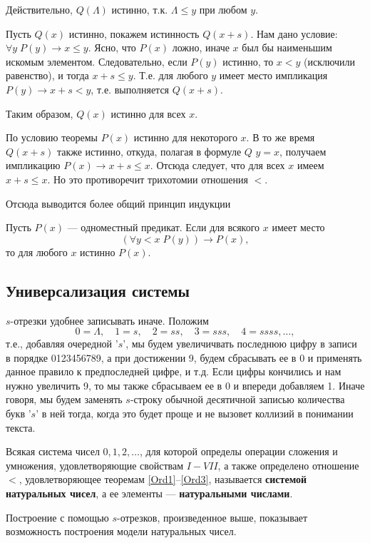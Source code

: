 Действительно, $Q(\Lambda)$ истинно, т.к. $\Lambda\le y$ при любом $y$.

Пусть $Q(x)$ истинно, покажем истинность $Q(x+s)$. Нам дано условие: $\forall y\;P(y)\to x\le y$. Ясно, что $P(x)$ ложно, иначе $x$ был бы наименьшим искомым элементом. Следовательно, если $P(y)$ истинно, то $x<y$ (исключили равенство), и тогда $x+s\le y$. Т.е. для любого $y$ имеет место импликация $P(y)\to x+s<y$, т.е. выполняется $Q(x+s)$.

Таким образом, $Q(x)$ истинно для всех $x$.

По условию теоремы $P(x)$ истинно для некоторого $x$. В то же время $Q(x+s)$ также истинно, откуда, полагая в формуле $Q$ $y=x$, получаем импликацию $P(x)\to x+s\le x$. Отсюда следует, что для всех $x$ имеем $x+s\le x$. Но это противоречит трихотомии отношения $<$.
\epf

Отсюда выводится более общий принцип индукции
\begin{thrm} Пусть $P(x)$ --- одноместный предикат. Если для всякого $x$ имеет место
$$
(\forall y<x\;P(y))\to P(x),
$$
то для любого $x$ истинно $P(x)$.
\end{thrm}



\subsection{Универсализация системы}


$s$-отрезки удобнее записывать иначе. Положим
$$
0=\Lambda,\quad 1=s,\quad 2=ss,\quad 3=sss,\quad 4=ssss,\dots,
$$
т.е., добавляя очередной '$s$', мы будем увеличичвать последнюю цифру в записи в порядке 0123456789, а при достижении 9, будем сбрасывать ее в 0 и применять данное правило к предпоследней цифре, и т.д. Если цифры кончились и нам нужно увеличить 9, то мы также сбрасываем ее в 0 и впереди добавляем 1. Иначе говоря, мы будем заменять $s$-строку обычной десятичной записью количества букв '$s$' в ней тогда, когда это будет проще и не вызовет коллизий в понимании текста.

Всякая система чисел $0,1,2,\dots$, для которой определы операции сложения и умножения, удовлетворяющие свойствам $I-VII$, а также определено отношение $<$, удовлетворяющее теоремам \ref{Ord1}--\ref{Ord3}, называется \textbf{системой натуральных чисел}, а ее элементы --- \textbf{натуральными числами}.

Построение с помощью $s$-отрезков, произведенное выше, показывает возможность построения модели натуральных чисел.

